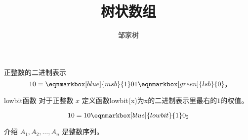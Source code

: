 \documentclass{ctexbeamer}
\title{树状数组}
\author{邹家树}
\begin{document}
\maketitle

\begin{frame}{正整数的二进制表示}
\begin{equation*}
10 =
\eqnmarkbox[blue]{msb}{1}
0
1
\eqnmarkbox[green]{lsb}{0}_2
\end{equation*}





\end{frame}

\begin{frame}{lowbit函数}
对于正整数 $x$ 定义函数lowbit(x)为x的二进制表示里最右的$1$的权值。

\begin{equation*}
10 =
1
0
\eqnmarkbox[blue]{lowbit}{1}
0_2
\end{equation*}


\end{frame}


\begin{frame}{介绍}
$A_1, A_2, \dots, A_n$ 是整数序列。
\end{frame}
\end{document}
